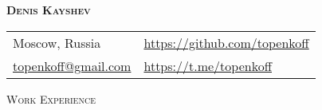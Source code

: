 \documentclass[a4paper]{article}
\newcommand{\lineunder} {
    \vspace*{-8pt} \\
    \hspace*{-18pt} \hrulefill \\
}
\newcommand{\header} [1] {
    {\hspace*{-18pt}\vspace*{6pt} \textsc{#1}}
    \vspace*{-6pt} \lineunder
}
\begin{document}
\vspace*{-40pt}

\vspace*{-10pt}
\begin{center}
    \textbf{{\huge \scshape {Denis Kayshev}}}\\
    \vspace*{10pt}
    \begin{tabular}{l l}
        Moscow, Russia & \url{https://github.com/topenkoff} \\
        \href{mailto:topenkoff@gmail.com}{topenkoff@gmail.com} & \url{https://t.me/topenkoff} \\
    \end{tabular}
    \vspace*{15pt}
\end{center}

\header{Work Experience}
\vspace{1mm}

\end{document}
